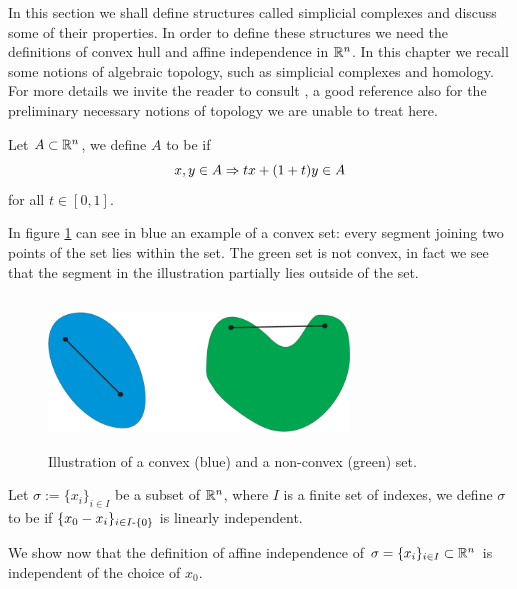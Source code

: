 \documentclass[../1.tex]{subfiles}
\begin{document}
    
    \label{section:1.1}

    In this section we shall define structures called simplicial complexes and discuss some of their properties. In order to define these structures
    we need the definitions of convex hull and affine independence in $\mathbb{R}^n$. In this chapter we recall some notions of algebraic topology, such as simplicial
    complexes and homology. For more details we invite the reader to consult \cite{hatcher}, a good reference also for the preliminary necessary notions of
    topology we are unable to treat here.    

    \begin{defn}
        Let $A \subset \mathbb{R}^n$, we define $A$ to be  if
        \[ x,y \in A \Rightarrow tx + (1+t)y \in A \]
        for all $t \in [0,1]$.
    \end{defn}

    In figure \ref{fig:1} can see in blue an example of a convex set: every segment joining two points of the set lies within the set.
    The green set is not convex, in fact we see that the segment in the illustration partially lies outside of the set.

    \begin{figure}[H]
        \centering
        \includegraphics[width=8cm, height=4cm]{sections/1/convex}
        \caption{Illustration of a convex (blue) and a non-convex (green) set.}
        \label{fig:1}
    \end{figure}

    \begin{defn}
        Let $\sigma := \{x_i\}_{i \in I}$ be a subset of $\mathbb{R}^n$, where $I$ is a finite set of indexes, we define $\sigma$ to be  if 
        $\{ x_0 - x_i\}_{i \in I \text{-} \{0\}}$ is linearly independent.
    \end{defn}

    We show now that the definition of affine independence of $\sigma = \{x_i\}_{i \in I} \subset \mathbb{R}^n$ is independent of the choice of $x_0$.
      
\end{document}
